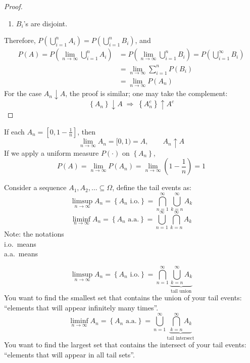 \begin{reqproof}
\begin{theorem}
\begin{proof}
\begin{enumerate}
            \item $B_i$'s are disjoint.
        \end{enumerate}
        Therefore, $P\left(\bigcup_{i=1}^n A_i\right) = P\left(\bigcup_{i=1}^n B_i\right)$, and
        \begin{align*}
            P(A) = P\left(\lim_{n\to\infty}\bigcup_{i=1}^n A_i\right) &= P\left(\lim_{n\to\infty}\bigcup_{i=1}^n B_i\right) = P\left(\bigcup_{i=1}^\infty B_i\right)\\
            &= \lim_{n\to\infty}\sum_{i=1}^n P(B_i)\\
            &= \lim_{n\to\infty} P(A_n)
        \end{align*}
        For the case $A_n \downarrow A$, the proof is similar; one may take the complement:
        \[\left\{A_n\right\}\downarrow A \;\Rightarrow\; \left\{A_n^c\right\}\uparrow A^c\]
    \end{proof}
\end{theorem}
\end{reqproof}

\begin{example}[][5.1.1]
    If each $A_n = \left[0, 1-\frac{1}{n}\right]$, then
    \[\lim_{n\to\infty} A_n = [0,1) = A, \qquad A_n \uparrow A\]
    If we apply a uniform measure $P(\cdot)$ on $\left\{A_n\right\}$,
    \[P(A) = \lim_{n\to\infty} P(A_n) = \lim_{n\to\infty}\left(1-\frac{1}{n}\right) = 1\]
\end{example}

\begin{reqproof}
\begin{definition}
    Consider a sequence $A_1, A_2, \dots \subseteq \Omega$, define the tail events as:
    \[\limsup_{n\to\infty} A_n = \left\{A_n \text{ i.o.}\right\} = \bigcap_{n=1}^\infty \bigcup_{k=n}^\infty A_k\]
    \[\liminf_{n\to\infty} A_n = \left\{A_n \text{ a.a.}\right\} = \bigcup_{n=1}^\infty \bigcap_{k=n}^\infty A_k\]
    Note: the notations
    \\ i.o.\ means 
    \\ a.a.\ means 
\end{definition}
\end{reqproof}

\[\limsup_{n\to\infty} A_n = \left\{A_n \text{ i.o.}\right\} = \bigcap_{n=1}^\infty \underbrace{\bigcup_{k=n}^\infty A_k}_{\text{tail union}}\]
You want to find the smallest set that contains the union of your tail events:
\\``elements that will appear infinitely many times''.
\[\liminf_{n\to\infty} A_n = \left\{A_n \text{ a.a.}\right\} = \bigcup_{n=1}^\infty \underbrace{\bigcap_{k=n}^\infty A_k}_{\text{tail intersect}}\]
You want to find the largest set that contains the intersect of your tail events:
\\``elements that will appear in all tail sets''.

